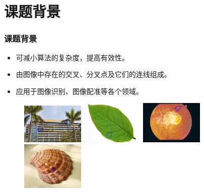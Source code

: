 \documentclass[notheorems,mathserif,table,compress]{beamer}  %
\begin{document}
\section{课题背景}

\begin{frame}
\frametitle{课题背景}
\begin{itemize}
\item {\color{red}{局部特征}}可减小算法的复杂度，提高有效性。
\item {\color{red}{环结构特征}}由图像中存在的交叉、分叉点及它们的连线组成。
\item 应用于图像识别、图像配准等各个领域。
\end{itemize}
\begin{figure}[H]
\centering
  \begin{minipage}[b]{0.33\textwidth} 
      \centering 
      \includegraphics[width=3cm]{chap02/building}
    \end{minipage}
  \begin{minipage}[b]{0.33\textwidth}
    \centering
    \includegraphics[width=3cm]{chap02/reaf}
  \end{minipage}
  \begin{minipage}[b]{0.33\textwidth}
    \centering
    \includegraphics[width=3cm]{chap02/retinal}
  \end{minipage}
  \begin{minipage}[b]{0.33\textwidth}
    \centering
    \includegraphics[width=3cm]{chap02/scallop}
  \end{minipage}
\caption*{\color{blue}{图像中的环结构}}
\end{figure}
\end{frame}
\end{document}
